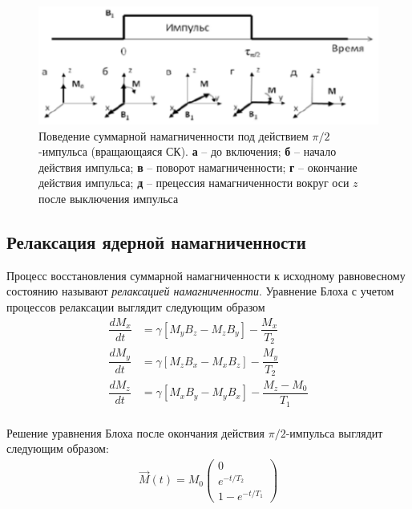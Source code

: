 \begin{figure}[h]
	\centering
	\includegraphics[width=0.7\linewidth]{M-rotation}
	\caption{Поведение суммарной намагниченности под действием $\pi /2$-импульса (вращающаяся СК). \textbf{а} -- до включения; \textbf{б} -- начало действия импульса; \textbf{в} -- поворот намагниченности; \textbf{г} --  окончание действия импульса; \textbf{д} -- прецессия намагниченности вокруг оси $z$ после выключения импульса}
	\label{fig:m-rotation}
\end{figure}


\subsection{Релаксация ядерной намагниченности}
Процесс восстановления суммарной намагниченности к исходному равновесному состоянию называют \textit{релаксацией намагниченности}. Уравнение Блоха с учетом процессов релаксации выглядит следующим образом
\begin{align}
\label{Bloh-relaxaion}
\dfrac{d M_x}{dt} &= \gamma \left[ M_y B_z - M_z B_y\right] - \dfrac{M_x}{T_2} \\
\dfrac{d M_y}{dt} &= \gamma \left[ M_z B_x - M_x B_z\right] - \dfrac{M_y}{T_2} \\
\dfrac{d M_z}{dt} &= \gamma \left[ M_x B_y - M_y B_x\right] - \dfrac{M_z - M_0}{T_1} \\
\end{align}

Решение уравнения Блоха после окончания действия $\pi /2$-импульса выглядит следующим образом:
\begin{align}
\label{Bloh-solution-pi/2}
	\vec{M}(t) = M_0
	\begin{pmatrix}
		0 \\
		e^{-t/T_2} \\
		1 - e^{-t/T_1}
	\end{pmatrix}
\end{align}


